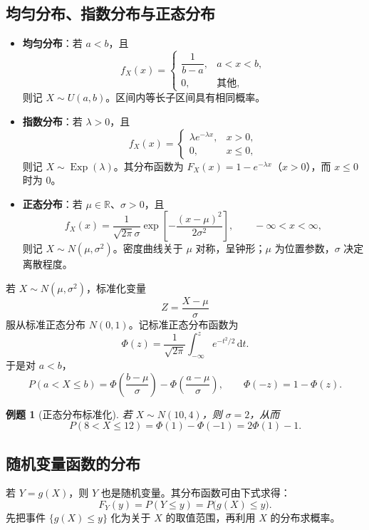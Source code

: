 \documentclass[11pt,a4paper,fontset=fandol]{ctexart}
\newtheorem{example}{例题}[section]
\theoremstyle{remark}
\begin{document}
\subsection{均匀分布、指数分布与正态分布}
\begin{itemize}
    \item \textbf{均匀分布}：若 $a<b$，且
    \[
        f_X(x)=
        \begin{cases}
            \dfrac{1}{b-a}, & a<x<b,\\
            0, & \text{其他},
        \end{cases}
    \]
    则记 $X\sim U(a,b)$。区间内等长子区间具有相同概率。
    \item \textbf{指数分布}：若 $\lambda>0$，且
    \[
        f_X(x)=
        \begin{cases}
            \lambda e^{-\lambda x}, & x>0,\\
            0, & x\leq 0,
        \end{cases}
    \]
    则记 $X\sim\operatorname{Exp}(\lambda)$。其分布函数为 $F_X(x)=1-e^{-\lambda x}$（$x>0$），而 $x\leq0$ 时为 $0$。
    \item \textbf{正态分布}：若 $\mu\in\mathbb{R}$、$\sigma>0$，且
    \[
        f_X(x)=\frac{1}{\sqrt{2\pi}\sigma}
        \exp\left[-\frac{(x-\mu)^2}{2\sigma^2}\right],
        \qquad -\infty<x<\infty,
    \]
    则记 $X\sim N(\mu,\sigma^2)$。密度曲线关于 $\mu$ 对称，呈钟形；$\mu$ 为位置参数，$\sigma$ 决定离散程度。
\end{itemize}

若 $X\sim N(\mu,\sigma^2)$，标准化变量
\[
    Z=\frac{X-\mu}{\sigma}
\]
服从标准正态分布 $N(0,1)$。记标准正态分布函数为
\[
    \Phi(z)=\frac{1}{\sqrt{2\pi}}\int_{-\infty}^{z}e^{-t^2/2}\,\mathrm{d}t.
\]
于是对 $a<b$，
\[
    P(a<X\leq b)
    =\Phi\left(\frac{b-\mu}{\sigma}\right)
    -\Phi\left(\frac{a-\mu}{\sigma}\right),
    \qquad \Phi(-z)=1-\Phi(z).
\]

\begin{example}[正态分布标准化]
若 $X\sim N(10,4)$，则 $\sigma=2$，从而
\[
    P(8<X\leq 12)
    =\Phi(1)-\Phi(-1)
    =2\Phi(1)-1.
\]
\end{example}

\subsection{随机变量函数的分布}
若 $Y=g(X)$，则 $Y$ 也是随机变量。其分布函数可由下式求得：
\[
    F_Y(y)=P(Y\leq y)=P\bigl(g(X)\leq y\bigr).
\]
先把事件 $\{g(X)\leq y\}$ 化为关于 $X$ 的取值范围，再利用 $X$ 的分布求概率。
\end{document}
